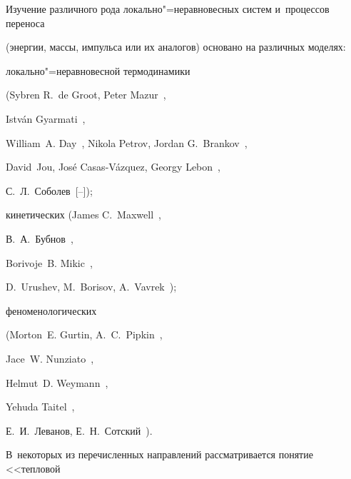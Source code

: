 






\renewcommand{\JournalDataOnline}{\displaydate{kude}}





\makerutitle



\smallskip






Изучение различного рода локально"=неравновесных систем \linebreak и~процессов переноса

(энергии, массы, импульса или их аналогов) основано на различных моделях:

локально"=неравновесной термодинамики 

(Sybren R.~de Groot, Peter Mazur~\cite{kud:bib1},

Istv\'an Gyarmati~\cite{kud:bib2},

William~A. Day~\cite{kud:W.Day}, Nikola Petrov, Jordan G.~Brankov~\cite{kud:Brankov},

David~Jou,  Jos\'e Casas-V\'azquez, Georgy Lebon~\mbox{\cite{kud:Lebon, kud:bib5}}, 

С.~Л.~Соболев~[--]); 

кинетических (James C.~Maxwell~\cite{kud:Maxwell}, 

В.~А.~Бубнов~\cite{kud:bib41}, 

Borivoje~B. Mikic~\cite{kud:Mikic},

D.~Urushev, M.~Borisov, A.~Vavrek~\cite{kud:Urushev}); 

феноменологических 

(Morton~E. Gurtin, A.~C.~Pipkin~\cite{kud:Gurtin},

Jace~W. Nunziato~\cite{kud:Nunziato}, 

Helmut~D. Weymann~\cite{kud:Weymann}, 

Yehuda Taitel~\cite{kud:Taitel}, 

Е.~И.~Леванов, Е.~Н.~Сотский~\cite{kud:bib31}). 

В~некоторых из перечисленных направлений рассматривается понятие <<тепловой

